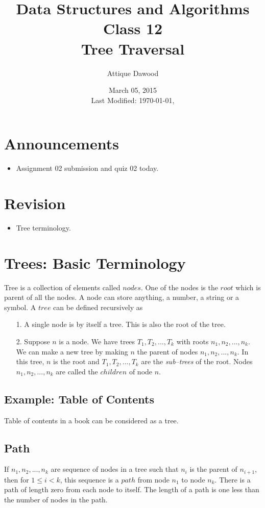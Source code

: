 \documentclass[12pt,a4paper]{article}
\title{Data Structures and Algorithms\\Class 12\\Tree Traversal}
\author{Attique Dawood}
\date{March 05, 2015\\[0.2cm] Last Modified: \today, \currenttime}
\begin{document}
\maketitle
\section{Announcements}
\begin{itemize}
\item Assignment 02 submission and quiz 02 today.
\end{itemize}
\section{Revision}
\begin{itemize}
\item Tree terminology.
\end{itemize}
\section{Trees: Basic Terminology~\cite[Sec. 3.1]{Aho}}
Tree is a collection of elements called $nodes$. One of the nodes is the $root$ which is parent of all the nodes. A node can store anything, a number, a string or a symbol. A $tree$ can be defined recursively as
\begin{itemize}
\item[1.] A single node is by itself a tree. This is also the root of the tree.
\item[2.] Suppose $n$ is a node. We have trees $T_1, T_2,..., T_k$ with roots $n_1, n_2,..., n_k$. We can make a new tree by making $n$ the parent of nodes $n_1, n_2,..., n_k$. In this tree, $n$ is the root and $T_1, T_2,..., T_k$ are the \textit{sub--trees} of the root. Nodes $n_1, n_2,..., n_k$ are called the $children$ of node $n$.
\end{itemize}
\subsection{Example: Table of Contents}
Table of contents in a book can be considered as a tree.
\subsection{Path}
If $n_1, n_2,..., n_k$ are sequence of nodes in a tree such that $n_i$ is the parent of $n_{i+1}$, then for $1\leq i<k$, this sequence is a $path$ from node $n_1$ to node $n_k$. There is a path of length zero from each node to itself. The length of a path is one less than the number of nodes in the path.
\end{document}
